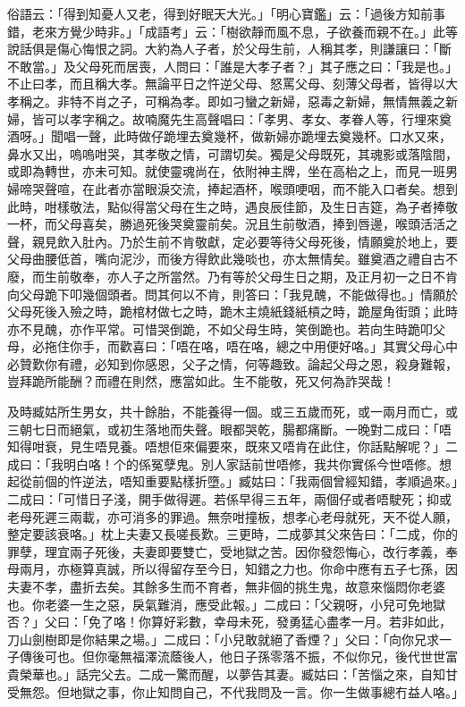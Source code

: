 \documentclass[a5paper, 12pt, openany]{book} %
\begin{document}
	俗語云：「得到知憂人又老，得到好眠天大光。」「明心寶鑑」云：「過後方知前事錯，老來方覺少時非。」「成語考」云：「樹欲靜而風不息，子欲養而親不在。」此等說話俱是傷心悔恨之詞。大約為人子者，於父母生前，人稱其孝，則謙讓曰：「斷不敢當。」及父母死而居喪，人問曰：「誰是大孝子者？」其子應之曰：「我是也。」不止曰孝，而且稱大孝。無論平日之忤逆父母、怒罵父母、刻薄父母者，皆得以大孝稱之。非特不肖之子，可稱為孝。即如刁蠻之新婦，惡毒之新婦，無情無義之新婦，皆可以孝字稱之。故喃魔先生高聲唱曰：「孝男、孝女、孝眷人等，行埋來奠酒呀。」聞唱一聲，此時做仔跪埋去奠幾杯，做新婦亦跪埋去奠幾杯。口水又來，鼻水又出，嗚嗚咁哭，其孝敬之情，可謂切矣。獨是父母既死，其魂影或落陰間，或即為轉世，亦未可知。就使靈魂尚在，依附神主牌，坐在高枱之上，而見一班男婦啼哭聲喧，在此者亦當眼淚交流，捧起酒杯，喉頭哽咽，而不能入口者矣。想到此時，咁樣敬法，點似得當父母在生之時，遇良辰佳節，及生日吉筵，為子者捧敬一杯，而父母喜矣，勝過死後哭奠靈前矣。況且生前敬酒，捧到唇邊，喉頭活活之聲，親見飲入肚內。乃於生前不肯敬獻，定必要等待父母死後，情願奠於地上，要父母曲腰低首，嘴向泥沙，而後方得飲此幾啖也，亦太無情矣。雖奠酒之禮自古不廢，而生前敬奉，亦人子之所當然。乃有等於父母生日之期，及正月初一之日不肯向父母跪下叩幾個頭者。問其何以不肯，則答曰：「我見醜，不能做得也。」情願於父母死後入殮之時，跪棺材做七之時，跪木主燒紙錢紙槓之時，跪屋角街頭；此時亦不見醜，亦作平常。可惜哭倒跪，不如父母生時，笑倒跪也。若向生時跪叩父母，必拖住你手，而歡喜曰：「唔在咯，唔在咯，總之中用便好咯。」其實父母心中必贊歎你有禮，必知到你感恩，父子之情，何等趣致。論起父母之恩，殺身難報，豈拜跪所能酬？而禮在則然，應當如此。生不能敬，死又何為詐哭哉！

	及時臧姑所生男女，共十餘胎，不能養得一個。或三五歲而死，或一兩月而亡，或三朝七日而絕氣，或初生落地而失聲。眼都哭乾，腸都痛斷。一晚對二成曰：「唔知得咁衰，見生唔見養。唔想佢來偏要來，既來又唔肯在此住，你話點解呢？」二成曰：「我明白咯！个的係冤孽鬼。別人家話前世唔修，我共你實係今世唔修。想起從前個的忤逆法，唔知重要點樣折墮。」臧姑曰：「我兩個曾經知錯，孝順過來。」二成曰：「可惜日子淺，開手做得遲。若係早得三五年，兩個仔或者唔駛死；抑或老母死遲三兩載，亦可消多的罪過。無奈咁撞板，想孝心老母就死，天不從人願，整定要該衰咯。」枕上夫妻又長嗟長歎。三更時，二成夢其父來告曰：「二成，你的罪孽，理宜兩子死後，夫妻即要雙亡，受地獄之苦。因你發怨悔心，改行孝義，奉母兩月，亦極算真誠，所以得留存至今日，知錯之力也。你命中應有五子七孫，因夫妻不孝，盡折去矣。其餘多生而不育者，無非個的挑生鬼，故意來惱悶你老婆也。你老婆一生之惡，戾氣難消，應受此報。」二成曰：「父親呀，小兒可免地獄否？」父曰：「免了咯！你算好彩數，幸母未死，發勇猛心盡孝一月。若非如此，刀山劍樹即是你結果之場。」二成曰：「小兒敢就絕了香煙？」父曰：「向你兄求一子傳後可也。但你毫無福澤流蔭後人，他日子孫零落不振，不似你兄，後代世世富貴榮華也。」話完父去。二成一驚而醒，以夢告其妻。臧姑曰：「苦惱之來，自知甘受無怨。但地獄之事，你止知問自己，不代我問及一言。你一生做事總冇益人咯。」
\end{document}
